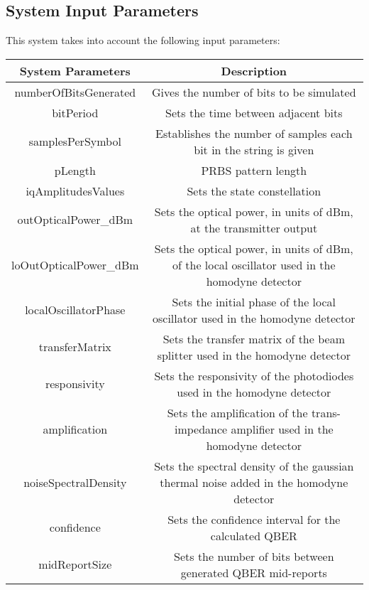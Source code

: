 \subsection*{System Input Parameters}

This system takes into account the following input parameters:

\begin{table}[H]
\centering
\begin{tabulary}{1.0\textwidth}{|C|C|}
\hline
\textbf{System Parameters} & \textbf{Description} 																 \\ \hline
numberOfBitsGenerated      & Gives the number of bits to be simulated		          										 \\ \hline
bitPeriod                  & Sets the time between adjacent bits                                                           \\ \hline
samplesPerSymbol           & Establishes the number of samples each bit in the string is given 	         \\ \hline
pLength                    & PRBS pattern length					                      									 \\ \hline
iqAmplitudesValues         & Sets the state constellation																	 \\ \hline
outOpticalPower\_dBm       & Sets the optical power, in units of dBm, at the transmitter output							 \\ \hline
loOutOpticalPower\_dBm     & Sets the optical power, in units of dBm, of the local oscillator used in the homodyne detector \\ \hline
localOscillatorPhase       & Sets the initial phase of the local oscillator used in the homodyne detector					 \\ \hline
transferMatrix             & Sets the transfer matrix of the beam splitter used in the homodyne detector					 \\ \hline
responsivity               & Sets the responsivity of the photodiodes used in the homodyne detector						 \\ \hline
amplification              & Sets the amplification of the trans-impedance amplifier used in the homodyne detector			 \\ \hline
noiseSpectralDensity       & Sets the spectral density of the gaussian thermal noise added in the homodyne detector		 \\ \hline
confidence                 & Sets the confidence interval for the calculated QBER                                           \\ \hline
midReportSize              & Sets the number of bits between generated QBER mid-reports                                     \\ \hline
\end{tabulary}
\end{table}		

